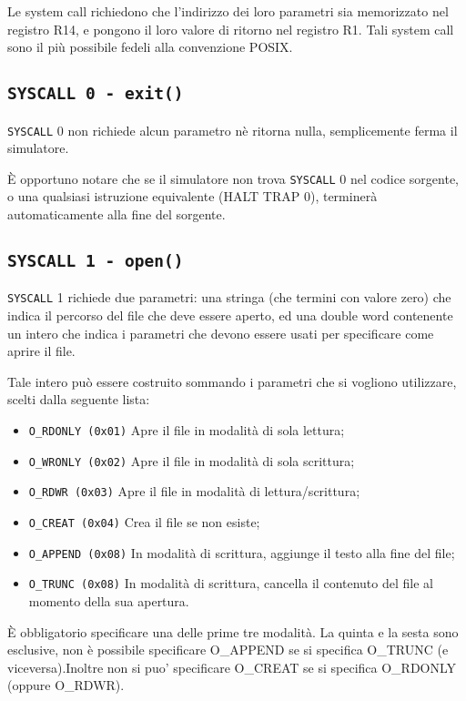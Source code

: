 \documentclass[12pt]{report}
\newcommand{\SC}{\texttt{SYSCALL}}
\begin{document}
Le system call richiedono che l'indirizzo dei loro parametri sia memorizzato nel registro R14, 
e pongono il loro valore di ritorno nel registro R1.
Tali system call sono il pi\`{u} possibile fedeli alla convenzione POSIX.

\subsection{\texttt{SYSCALL 0 - exit()}}
\SC{} 0 non richiede alcun parametro n\`{e} ritorna nulla, semplicemente ferma il simulatore.

\`{E} opportuno notare che se il simulatore non trova \SC{} 0 nel codice sorgente, 
o una qualsiasi istruzione equivalente (HALT  TRAP 0), terminer\`{a} automaticamente alla fine del sorgente.

\subsection{\texttt{SYSCALL 1 - open()}}
\label{sys1}
\SC{} 1 richiede due parametri: una stringa (che termini con valore zero) che indica il percorso del file 
che deve essere aperto, ed una double word contenente un intero che indica i parametri che devono 
essere usati per specificare come aprire il file.

Tale intero pu\`{o} essere costruito sommando i parametri che si vogliono utilizzare, scelti dalla seguente lista:
\begin{itemize}
	\item \texttt{O\_RDONLY (0x01)} Apre il file in modalit\`{a} di sola lettura;
	\item \texttt{O\_WRONLY (0x02)} Apre il file in modalit\`{a} di sola scrittura;
	\item \texttt{O\_RDWR (0x03)} Apre il file in modalit\`{a} di lettura/scrittura;
	\item \texttt{O\_CREAT (0x04)} Crea il file se non esiste;
	\item \texttt{O\_APPEND (0x08)} In modalit\`{a} di scrittura, aggiunge il testo alla fine del file;
	\item \texttt{O\_TRUNC (0x08)} In modalit\`{a} di scrittura, cancella il contenuto del file al momento della sua apertura.
\end{itemize}

\`{E} obbligatorio specificare una delle prime tre modalit\`{a}. La quinta e la sesta sono esclusive, 
non \`{e} possibile specificare O\_APPEND se si specifica O\_TRUNC (e viceversa).Inoltre non si puo' specificare O\_CREAT 
se si specifica O\_RDONLY (oppure O\_RDWR).
\end{document}

